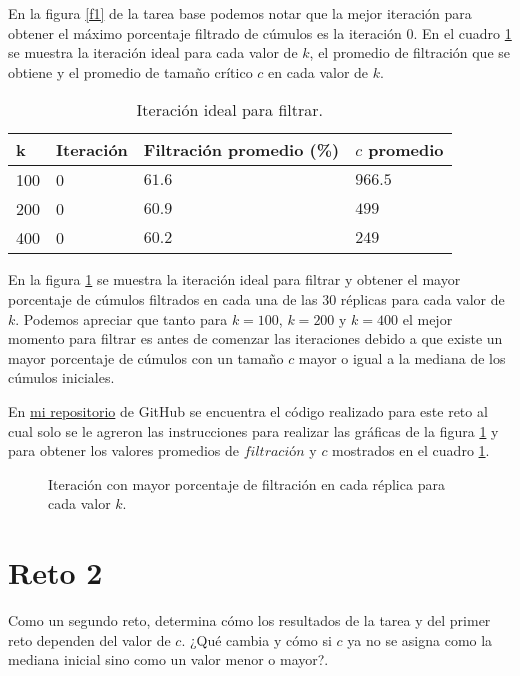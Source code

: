 \documentclass{article}
\begin{document}
En la figura \ref{f1} de la tarea base podemos notar que la mejor iteración para obtener el máximo porcentaje filtrado de cúmulos es la iteración $0$. En el cuadro \ref{Cuadro2} se muestra la iteración ideal para cada valor de $k$, el promedio de filtración que se obtiene y el promedio de tamaño crítico $c$ en cada valor de $k$.

\begin{table}[ht]
\centering
\caption{Iteración ideal para filtrar.}
\smallskip

\begin{tabular}{ |p{1cm}|p{1.5cm}|p{3.8cm}|p{2cm}|}
 \hline
 k & Iteración & Filtración promedio (\%) & $c$ promedio \\
 \hline
 100 & 0 &  $61.6$ & $966.5$ \\
 \hline
 200 & 0 & $60.9$ & $499$\\
 \hline
 400 & 0 & $60.2$ & $249$\\
 \hline
\end{tabular}
\label{Cuadro2}
\end{table}
\bigskip

En la figura \ref{f2} se muestra la iteración ideal para filtrar y obtener el mayor porcentaje de cúmulos filtrados en cada una de las $30$ réplicas para cada valor de $k$. Podemos apreciar que tanto para $k = 100$, $k = 200$ y $k = 400$ el mejor momento para filtrar es antes de comenzar las iteraciones debido a que existe un mayor porcentaje de cúmulos con un tamaño $c$ mayor o igual a la mediana de los cúmulos iniciales.
\bigskip

En \href{https://github.com/nataliaperez0/Simulation/tree/main/Tarea8}{mi repositorio}  de GitHub se encuentra el código realizado para este reto al cual solo se le agreron las instrucciones para realizar las gráficas de la figura \ref{f2} y para obtener los valores promedios de $filtración$ y $c$ mostrados en el cuadro \ref{Cuadro2}.

\begin{figure}[h!]
\centering
{}
\caption{Iteración con mayor porcentaje de filtración en cada réplica para cada valor $k$.} 
\label{f2}
\end{figure}

\newpage
\section{Reto 2}
Como un segundo reto, determina cómo los resultados de la tarea y del primer reto dependen del valor de $c$. ¿Qué cambia y cómo si $c$ ya no se asigna como la mediana inicial sino como un valor menor o mayor?.
\bigskip
\end{document}
